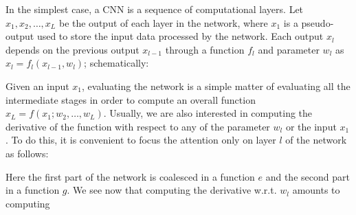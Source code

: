 \documentclass[12pt]{article}
\begin{document}
In the simplest case, a CNN is a sequence of computational layers. Let $x_1,x_2,\dots,x_L$ be the output of each layer in the network, where $x_1$ is a pseudo-output used to store the input data processed by the network. Each output $x_l$ depends on the previous output $x_{l-1}$ through a function $f_l$ and parameter $w_l$ as $x_l = f_l(x_{l-1},w_l)$; schematically:
\begin{center}
\end{center}
Given an input $x_1$, evaluating the network is a simple matter of evaluating all the intermediate stages in order to compute an overall function $x_L = f(x_1;w_2,\dots,w_L)$. Usually, we are also interested in computing the derivative of the function with respect to any of the parameter $w_l$ or the input $x_1$. To do this, it is convenient to focus the attention only on layer $l$ of the network as follows:
\begin{center}
\end{center}
Here the first part of the network is coalesced in a function $e$ and the second part in a function $g$. We see now that computing the derivative w.r.t. $w_l$ amounts to computing
\end{document}
